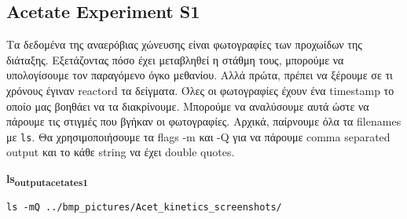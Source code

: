 \documentclass[11pt]{article}
\begin{document}
\subsection{Acetate Experiment S1}
\label{sec:org9ad3d4a}
Τα δεδομένα της αναερόβιας χώνευσης είναι φωτογραφίες των προχωίδων της διάταξης. Εξετάζοντας πόσο έχει μεταβληθεί η στάθμη τους, μπορούμε να υπολογίσουμε τον παραγόμενο όγκο μεθανίου. Αλλά πρώτα, πρέπει να ξέρουμε σε τι χρόνους έγιναν reactord τα δείγματα. Όλες οι φωτογραφίες έχουν ένα timestamp το οποίο μας βοηθάει να τα διακρίνουμε. Μπορούμε να αναλύσουμε αυτά ώστε να πάρουμε τις στιγμές που βγήκαν οι φωτογραφίες. Αρχικά, παίρνουμε όλα τα filenames με \texttt{ls}. Θα χρησιμοποιήσουμε τα flags -m και -Q για να πάρουμε comma separated output και το κάθε string να έχει double quotes.

\textbf{ls\textsubscript{output}\textsubscript{acetate}\textsubscript{s1}}
\begin{verbatim}
ls -mQ ../bmp_pictures/Acet_kinetics_screenshots/
\end{verbatim}
\end{document}
